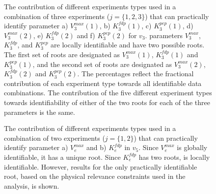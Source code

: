 \documentclass[10pt]{article}
\begin{document}
	\begin{figure}[!tbhp]
		\caption{The contribution of different experiments types used in a combination of three experiments ($j = \{1, 2, 3\}$) that can practically identify parameter a) $V_3^{max}(1)$, b) $K_3^{fdp}(1)$, c) $K_3^{pep}(1)$, d) $V_3^{max}(2)$, e) $K_3^{fdp}(2)$ and f) $K_3^{pep}(2)$ for $v_3$. parameters $V_3^{max}$, $K_3^{fdp}$, and $K_3^{pep}$ are locally identifiable and have two possible roots. The first set of roots are designated as $V_3^{max}(1)$, $K_3^{fdp}(1)$ and $K_3^{pep}(1)$, and the second set of roots are designated as $V_3^{max}(2)$, $K_3^{fdp}(2)$ and $K_3^{pep}(2)$. The percentages reflect the fractional contribution of each experiment type towards all identifiable data combinations. The contribution of the five different experiment types towards identifiability of either of the two roots for each of the three parameters is the same.}\label{fig:v3_exp_info}
	\end{figure} 

	\begin{figure}[!tbhp]
		\caption{The contribution of different experiments types used in a combination of two experiments ($j = \{1, 2\}$) that can practically identify parameter a) $V_e^{max}$ and b) $K_e^{fdp}$ in $v_5$. Since $V_e^{max}$ is globally identifiable, it has a unique root. Since $K_e^{fdp}$ has two roots, is locally identifiable. However, results for the only practically identifiable root, based on the physical relevance constraints used in the analysis, is shown.}\label{fig:v5_exp_info}
	\end{figure}	
\end{document}
